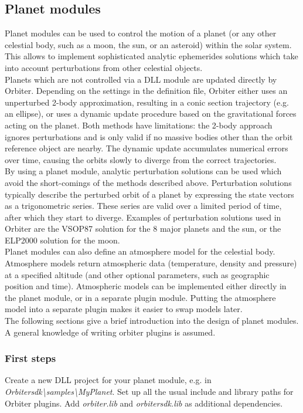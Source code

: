 \documentclass[Orbiter Developer Manual.tex]{subfiles}
\begin{document}
\subsection{Planet modules}
Planet modules can be used to control the motion of a planet (or any other celestial body, such as a moon, the sun, or an asteroid) within the solar system. This allows to implement sophisticated analytic ephemerides solutions which take into account perturbations from other celestial objects.\\
Planets which are not controlled via a DLL module are updated directly by Orbiter. Depending on the settings in the definition file, Orbiter either uses an unperturbed 2-body approximation, resulting in a conic section trajectory (e.g. an ellipse), or uses a dynamic update procedure based on the gravitational forces acting on the planet. Both methods have limitations: the 2-body approach ignores perturbations and is only valid if no massive bodies other than the orbit reference object are nearby. The dynamic update accumulates numerical errors over time, causing the orbits slowly to diverge from the correct trajectories.\\
By using a planet module, analytic perturbation solutions can be used which avoid the short-comings of the methods described above. Perturbation solutions typically describe the perturbed orbit of a planet by expressing the state vectors as a trigonometric series. These series are valid over a limited period of time, after which they start to diverge. Examples of perturbation solutions used in Orbiter are the VSOP87 solution for the 8 major planets and the sun, or the ELP2000 solution for the moon.\\
Planet modules can also define an atmosphere model for the celestial body. Atmosphere models return atmospheric data (temperature, density and pressure) at a specified altitude (and other optional parameters, such as geographic position and time). Atmospheric models can be implemented either directly in the planet module, or in a separate plugin module. Putting the atmosphere model into a separate plugin makes it easier to swap models later.\\
The following sections give a brief introduction into the design of planet modules. A general knowledge of writing orbiter plugins is assumed.

\subsubsection{First steps}
Create a new DLL project for your planet module, e.g. in \textit{Orbitersdk\textbackslash samples\textbackslash MyPlanet}. Set up all the usual include and library paths for Orbiter plugins. Add \textit{orbiter.lib} and \textit{orbitersdk.lib} as additional dependencies.
\end{document}
